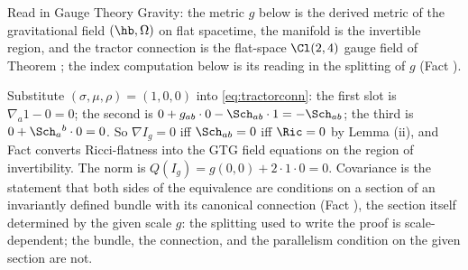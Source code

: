 Read in Gauge Theory Gravity: the metric $g$ below is the derived metric of the gravitational field $(\hb, \Omega)$ on flat spacetime, the manifold is the invertible region, and the tractor connection is the flat-space $\Cl(2,4)$ gauge field of Theorem ; the index computation below is its reading in the splitting of $g$ (Fact ).

Substitute $(\sigma, \mu, \rho) = (1, 0, 0)$ into \eqref{eq:tractorconn}: the first slot is $\nabla_a 1 - 0 = 0$; the second is $0 + g_{ab}\cdot 0 - \Sch_{ab}\cdot 1 = -\Sch_{ab}$; the third is $0 + \Sch_a{}^b \cdot 0 = 0$. So $\nabla I_g = 0$ iff $\Sch_{ab} = 0$ iff $\Ric = 0$ by Lemma (ii), and Fact  converts Ricci-flatness into the GTG field equations on the region of invertibility. The norm is $Q(I_g) = g(0,0) + 2 \cdot 1 \cdot 0 = 0$. Covariance is the statement that both sides of the equivalence are conditions on a section of an invariantly defined bundle with its canonical connection (Fact ), the section itself determined by the given scale $g$: the splitting used to write the proof is scale-dependent; the bundle, the connection, and the parallelism condition on the given section are not.
